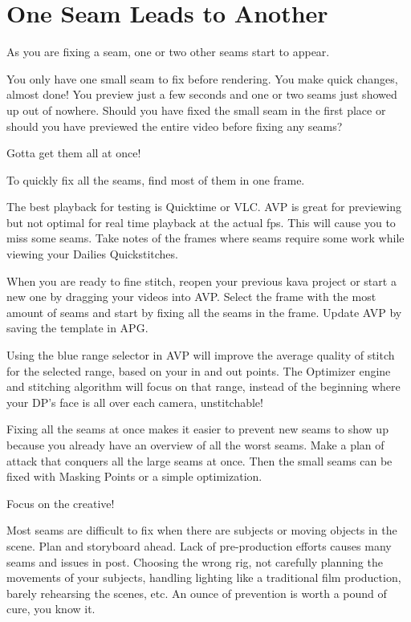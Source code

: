 \chapter{One Seam Leads to Another}
\pagecolor{white}
\label{chap:38}
\begin{fullwidth}


\problem

{\large As you are fixing a seam, one or two other seams start to appear. \par}

You only have one small seam to fix before rendering. You make quick changes, almost done! You preview just a few seconds and one or two seams just showed up out of nowhere. Should you have fixed the small seam in the first place or should you have previewed the entire video before fixing any seams?

\solutions

{\large Gotta get them all at once! \par}

To quickly fix all the seams, find most of them in one frame. 

The best playback for testing is Quicktime or VLC. AVP is great for previewing but not optimal for real time playback at the actual fps. This will cause you to miss some seams. Take notes of the frames where seams require some work while viewing your Dailies Quickstitches.

When you are ready to fine stitch, reopen your previous kava project or start a new one by dragging your videos into AVP. Select the frame with the most amount of seams and start by fixing all the seams in the frame. Update AVP by saving the template in APG.

Using the blue range selector in AVP will improve the average quality of stitch for the selected range, based on your in and out points. The Optimizer engine and stitching algorithm will focus on that range, instead of the beginning where your DP’s face is all over each camera, unstitchable!

Fixing all the seams at once makes it easier to prevent new seams to show up because you already have an overview of all the worst seams. Make a plan of attack that conquers all the large seams at once. Then the small seams can be fixed with Masking Points or a simple optimization.

{\large Focus on the creative! \par}

Most seams are difficult to fix when there are subjects or moving objects in the scene. Plan and storyboard ahead. Lack of pre-production efforts causes many seams and issues in post. Choosing the wrong rig, not carefully planning the movements of your subjects, handling lighting like a traditional film production, barely rehearsing the scenes, etc. An ounce of prevention is worth a pound of cure, you know it. 


\end{fullwidth}
